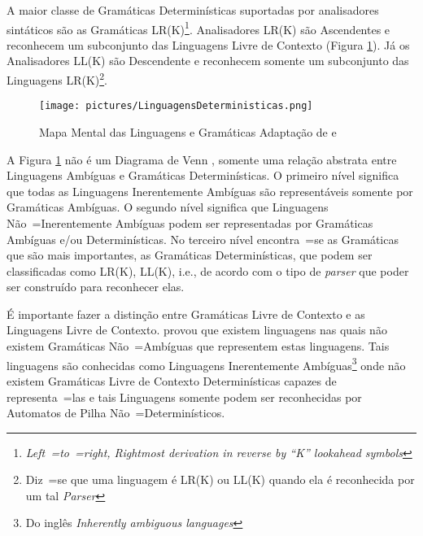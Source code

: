 {    A maior classe de Gramáticas Determinísticas suportadas por analisadores
    sintáticos são as Gramáticas LR(K)\footnote{\textit{Left~=to~=right,
    Rightmost derivation in reverse by ``K'' lookahead symbols
    }}.
    Analisadores LR(K) \cite{ahoCompilerDragonBook} são Ascendentes e
    reconhecem um subconjunto das Linguagens Livre de Contexto
    (Figura \ref{fig:pictures/LinguagensDeterministicas.png}).
    Já os Analisadores LL(K) são Descendente e
    reconhecem somente um subconjunto das Linguagens LR(K)\footnote{Diz~=se que uma
    linguagem é LR(K) ou LL(K) quando ela é reconhecida por um tal \textit{Parser}}.
    \begin{figure}[H]
    \centering
    \texttt{[image: pictures/LinguagensDeterministicas.png]}
    \caption{Mapa Mental das Linguagens e
    Gramáticas \newline Adaptação de  e
    }
    \label{fig:pictures/LinguagensDeterministicas.png}
    \end{figure}

    A Figura \ref{fig:pictures/LinguagensDeterministicas.png} não é
    um Diagrama de Venn \cite{generalizedVennDiagrams},
    somente uma relação abstrata entre Linguagens Ambíguas e
    Gramáticas Determinísticas.
    O primeiro nível significa que todas as Linguagens Inerentemente
    Ambíguas são representáveis somente por Gramáticas Ambíguas.
    O segundo nível significa que Linguagens Não~=Inerentemente Ambíguas podem
    ser representadas por Gramáticas Ambíguas e/ou Determinísticas.
    No terceiro nível encontra~=se as Gramáticas que são mais importantes,
    as Gramáticas Determinísticas,
    que podem ser classificadas como LR(K),
    LL(K), i.e.,
    de acordo com o tipo de \textit{parser} que poder ser construído para reconhecer elas.

    É importante fazer a distinção entre Gramáticas Livre de Contexto e
    as Linguagens Livre de Contexto.
     provou que existem linguagens nas quais não
    existem Gramáticas Não~=Ambíguas que representem estas linguagens.
    Tais linguagens são conhecidas como Linguagens Inerentemente Ambíguas\footnote{Do
    inglês \textit{Inherently ambiguous languages}} onde não existem Gramáticas
    Livre de Contexto Determinísticas capazes de representa~=las e
    tais Linguagens somente podem ser reconhecidas por Automatos de Pilha Não~=Determinísticos.

}

